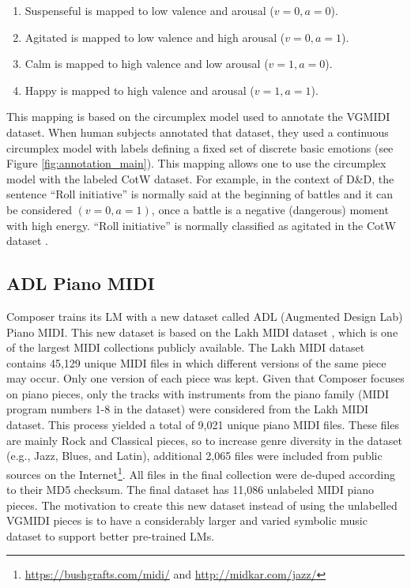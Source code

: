 \begin{enumerate}
    \item Suspenseful is mapped to low valence and arousal ($v = 0, a = 0$).
    \item Agitated is mapped to low valence and high arousal ($v = 0, a = 1$).
    \item Calm is mapped to high valence and low arousal ($v = 1, a = 0$).
    \item Happy is mapped to high valence and arousal ($v = 1, a = 1$).
\end{enumerate}

This mapping is based on the circumplex model used to annotate the VGMIDI dataset. When human subjects annotated that dataset, they used a continuous circumplex model with labels defining a fixed set of discrete basic emotions (see Figure \ref{fig:annotation_main}). This mapping allows one to use the circumplex model with the labeled CotW dataset. For example, in the context of D\&D, the sentence ``Roll initiative'' is normally said at the beginning of battles and it can be considered $(v = 0, a = 1)$, once a battle is a negative (dangerous) moment with high energy. ``Roll initiative'' is normally classified as agitated in the CotW dataset \cite{padovani2017}.

\subsection{ADL Piano MIDI}

Composer trains its LM with a new dataset called ADL (Augmented Design Lab) Piano MIDI. This new dataset is based on the Lakh MIDI dataset \cite{raffel2016learning}, which is one of the largest MIDI collections publicly available. The Lakh MIDI dataset contains 45,129 unique MIDI files in which different versions of the same piece may occur. Only one version of each piece was kept. Given that Composer focuses on piano pieces, only the tracks with instruments from the piano family (MIDI program numbers 1-8 in the dataset) were considered from the Lakh MIDI dataset. This process yielded a total of 9,021 unique piano MIDI files. These files are mainly Rock and Classical pieces, so to increase genre diversity in the dataset (e.g., Jazz, Blues, and Latin), additional 2,065 files were included from public sources on the Internet\footnote{\url{https://bushgrafts.com/midi/} and \url{http://midkar.com/jazz/}}. All files in the final collection were de-duped according to their MD5 checksum. The final dataset has 11,086 unlabeled MIDI piano pieces. The motivation to create this new dataset instead of using the unlabelled VGMIDI pieces is to have a considerably larger and varied symbolic music dataset to support better pre-trained LMs.

